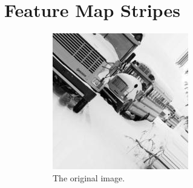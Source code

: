 \documentclass{beamer}
\begin{document}
\section{Feature Map Stripes}
\begin{frame}
\begin{figure}
\centering
\begin{subfigure}{0.3\textwidth}
\centering
\includegraphics[width=\textwidth]{images/stripes/original.jpg}
\caption{The original image.}
\label{subfig:stripes_original}
\end{subfigure}
\hfill
\begin{subfigure}{0.3\textwidth}
\centering

\end{subfigure}
\end{figure}
\end{frame}
\end{document}
